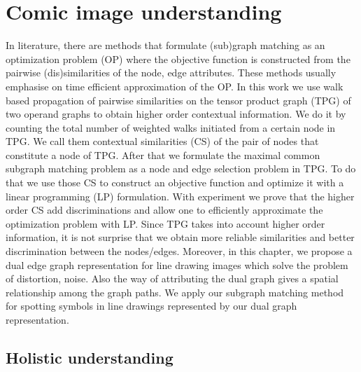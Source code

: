 \chapter{Comic image understanding} %
\label{chap:hp}
\graphicspath{{./chapters/8-hp/figs/}}

In literature, there are methods that formulate (sub)graph matching as an optimization problem (OP) where the objective function is constructed from the pairwise (dis)similarities of the node, edge attributes. These methods usually emphasise on time efficient approximation of the OP. In this work we use walk based propagation of pairwise similarities on the tensor product graph (TPG) of two operand graphs to obtain higher order contextual information. We do it by counting the total number of weighted walks initiated from a certain node in TPG. We call them contextual similarities (CS) of the pair of nodes that constitute a node of TPG. After that we formulate the maximal common subgraph matching problem as a node and edge selection problem in TPG. To do that we use those CS to construct an objective function and optimize it with a linear programming (LP) formulation. With experiment we prove that the higher order CS add discriminations and allow one to efficiently approximate the optimization problem with LP. Since TPG takes into account higher order information, it is not surprise that we obtain more reliable similarities and better discrimination between the nodes/edges. Moreover, in this chapter, we propose a dual edge graph representation for line drawing images which solve the problem of distortion, noise. Also the way of attributing the dual graph gives a spatial relationship among the graph paths. We apply our subgraph matching method for spotting symbols in line drawings represented by our dual graph representation.

\section{Holistic understanding}
\label{sec:pg:intro}


